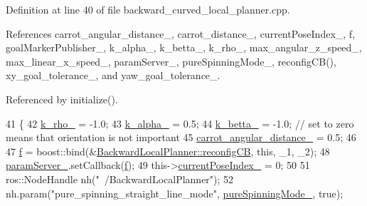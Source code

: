 Definition at line 40 of file backward\+\_\+curved\+\_\+local\+\_\+planner.\+cpp.



References carrot\+\_\+angular\+\_\+distance\+\_\+, carrot\+\_\+distance\+\_\+, current\+Pose\+Index\+\_\+, f, goal\+Marker\+Publisher\+\_\+, k\+\_\+alpha\+\_\+, k\+\_\+betta\+\_\+, k\+\_\+rho\+\_\+, max\+\_\+angular\+\_\+z\+\_\+speed\+\_\+, max\+\_\+linear\+\_\+x\+\_\+speed\+\_\+, param\+Server\+\_\+, pure\+Spinning\+Mode\+\_\+, reconfig\+C\+B(), xy\+\_\+goal\+\_\+tolerance\+\_\+, and yaw\+\_\+goal\+\_\+tolerance\+\_\+.



Referenced by initialize().


\begin{DoxyCode}
41 \{
42     \hyperlink{classmove__base__z__client_1_1backward__local__planner_1_1BackwardLocalPlanner_a9ae9a8c4c4663a999ba107aea9f6868d}{k\_rho\_} = -1.0;
43     \hyperlink{classmove__base__z__client_1_1backward__local__planner_1_1BackwardLocalPlanner_ac859500c0329247de08daf864fd2d4b1}{k\_alpha\_} = 0.5;
44     \hyperlink{classmove__base__z__client_1_1backward__local__planner_1_1BackwardLocalPlanner_aa2f7fe022cdc4eb11c17f6f576c732c6}{k\_betta\_} = -1.0; \textcolor{comment}{// set to zero means that orientation is not important}
45     \hyperlink{classmove__base__z__client_1_1backward__local__planner_1_1BackwardLocalPlanner_a3d6cba0748b85a67f5dfd7740de9530f}{carrot\_angular\_distance\_} = 0.5;
46 
47     \hyperlink{classmove__base__z__client_1_1backward__local__planner_1_1BackwardLocalPlanner_a8851653bff38ab410bda8aca0ba32574}{f} = boost::bind(&\hyperlink{classmove__base__z__client_1_1backward__local__planner_1_1BackwardLocalPlanner_a9dfe3fd3fd7a0c8ec414a78e1300d09c}{BackwardLocalPlanner::reconfigCB}, \textcolor{keyword}{this}, \_1, \_2);
48     \hyperlink{classmove__base__z__client_1_1backward__local__planner_1_1BackwardLocalPlanner_ab4e01416e0e6d79c00daaf7b2b9aae78}{paramServer\_}.setCallback(\hyperlink{classmove__base__z__client_1_1backward__local__planner_1_1BackwardLocalPlanner_a8851653bff38ab410bda8aca0ba32574}{f});
49     this->\hyperlink{classmove__base__z__client_1_1backward__local__planner_1_1BackwardLocalPlanner_af304b2e7cde744ad905a1ae7889102b6}{currentPoseIndex\_} = 0;
50 
51     ros::NodeHandle nh(\textcolor{stringliteral}{"~/BackwardLocalPlanner"});
52     nh.param(\textcolor{stringliteral}{"pure\_spinning\_straight\_line\_mode"}, \hyperlink{classmove__base__z__client_1_1backward__local__planner_1_1BackwardLocalPlanner_abf2b84c0d7a841a7fcec1b93bf5fdd0e}{pureSpinningMode\_}, \textcolor{keyword}{true});

\end{DoxyCode}
